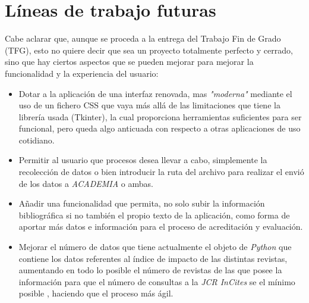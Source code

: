 \section{Líneas de trabajo futuras}
Cabe aclarar que, aunque se proceda a la entrega del Trabajo Fin de Grado (TFG), esto no quiere decir que sea un proyecto totalmente perfecto y cerrado, sino que hay ciertos aspectos que se pueden mejorar para mejorar la funcionalidad y la experiencia del usuario:
\begin{itemize}
	\item Dotar a la aplicación de una interfaz renovada, mas \emph{"moderna"} mediante el uso de un fichero CSS que vaya más allá de las limitaciones que tiene la librería usada (Tkinter), la cual proporciona herramientas suficientes para ser funcional, pero queda algo anticuada con respecto a otras aplicaciones de uso cotidiano.
	\item  Permitir al usuario que procesos desea llevar a cabo, simplemente la recolección de datos o bien introducir la ruta del archivo para realizar el envió de los datos a \emph{ACADEMIA} o ambas.
	\item Añadir una funcionalidad que permita, no solo subir la información bibliográfica si no también el propio texto de la aplicación, como forma de aportar más datos e información para el proceso de acreditación y evaluación.
	\item Mejorar el número de datos que tiene actualmente el objeto de \emph{Python} que contiene los datos referentes al índice de impacto de las distintas revistas, aumentando en todo lo posible el número de revistas de las que posee la información para que el número de consultas a la \emph{JCR InCites} se el mínimo posible , haciendo que el proceso más ágil.
\end{itemize} 